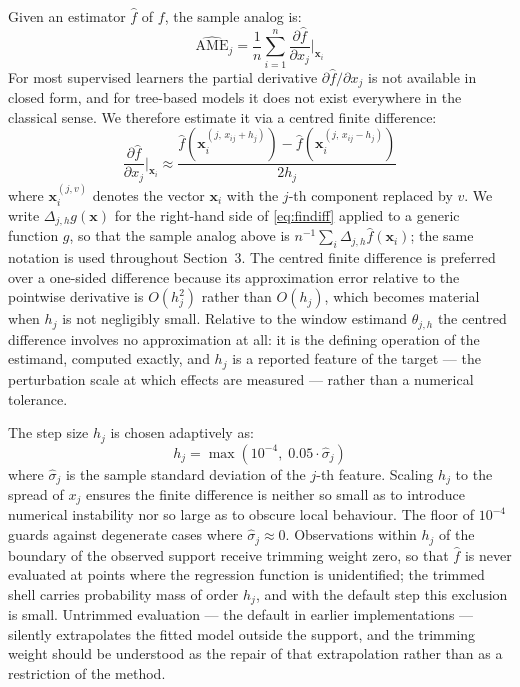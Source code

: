 \documentclass[12pt,a4paper]{article}
\numberwithin{equation}{section}
\theoremstyle{plain}
\theoremstyle{definition}
\newcommand{\Dh}{\Delta_{j,h}}
\begin{document}
	Given an estimator $\hat{f}$ of $f$, the sample analog is:
	\begin{equation}
		\widehat{\mathrm{AME}}_j = \frac{1}{n} \sum_{i=1}^n \frac{\partial \hat{f}}{\partial x_j}\bigg|_{\mathbf{x}_i}
	\end{equation}
	For most supervised learners the partial derivative $\partial \hat{f} / \partial x_j$ is not available in closed form, and for tree-based models it does not exist everywhere in the classical sense. We therefore estimate it via a centred finite difference:
	\begin{equation}
		\frac{\partial \hat{f}}{\partial x_j}\bigg|_{\mathbf{x}_i} \approx \frac{\hat{f}\!\left(\mathbf{x}_i^{(j,\, x_{ij} + h_j)}\right) - \hat{f}\!\left(\mathbf{x}_i^{(j,\, x_{ij} - h_j)}\right)}{2h_j}
		\label{eq:findiff}
	\end{equation}
	where $\mathbf{x}_i^{(j,v)}$ denotes the vector $\mathbf{x}_i$ with the $j$-th component replaced by $v$. We write $\Dh g(\mathbf{x})$ for the right-hand side of \eqref{eq:findiff} applied to a generic function $g$, so that the sample analog above is $n^{-1}\sum_i \Dh \hat{f}(\mathbf{x}_i)$; the same notation is used throughout Section~3. The centred finite difference is preferred over a one-sided difference because its approximation error relative to the pointwise derivative is $O(h_j^2)$ rather than $O(h_j)$, which becomes material when $h_j$ is not negligibly small. Relative to the window estimand $\theta_{j,h}$ the centred difference involves no approximation at all: it is the defining operation of the estimand, computed exactly, and $h_j$ is a reported feature of the target --- the perturbation scale at which effects are measured --- rather than a numerical tolerance.
	
	The step size $h_j$ is chosen adaptively as:
	\begin{equation}
		h_j = \max\!\left(10^{-4},\; 0.05 \cdot \hat{\sigma}_j\right)
	\end{equation}
	where $\hat{\sigma}_j$ is the sample standard deviation of the $j$-th feature. Scaling $h_j$ to the spread of $x_j$ ensures the finite difference is neither so small as to introduce numerical instability nor so large as to obscure local behaviour. The floor of $10^{-4}$ guards against degenerate cases where $\hat{\sigma}_j \approx 0$. Observations within $h_j$ of the boundary of the observed support receive trimming weight zero, so that $\hat{f}$ is never evaluated at points where the regression function is unidentified; the trimmed shell carries probability mass of order $h_j$, and with the default step this exclusion is small. Untrimmed evaluation --- the default in earlier implementations --- silently extrapolates the fitted model outside the support, and the trimming weight should be understood as the repair of that extrapolation rather than as a restriction of the method.
	
\end{document}
